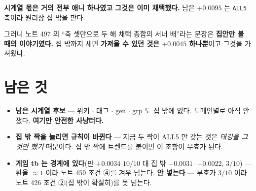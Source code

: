 \documentclass[11pt]{article}
\begin{document}
\textbf{시계열 몫은 거의 전부 애니 하나였고 그것은 이미 채택했다.} 남은
$+0.0095$ 는 \texttt{ALL5} 축이라 원리상 집 밖을 판다.

그러니 노트 497 의 ``축 셋만으로 두 해 채택 총합의 서너 배''라는 문장은
\textbf{집안만 볼 때의 이야기였다.} 집 밖까지 세면 \textbf{가져올 수
있던 것은 $+0.0045$ 하나뿐}이고 그것을 가져왔다.

\section*{남은 것}

\begin{itemize}
\item \textbf{남은 시계열 후보} --- 위키 $\cdot$ 태그 $\cdot$ gen $\cdot$
grp 도 집 밖에 없다. 도메인별로 아직 안 쟀다. \textbf{여기만 안전한
사냥터다.}
\item \textbf{집 밖 짝을 늘리면 규칙이 바뀐다} --- 지금 두 짝이 ALL5 만
갖는 것은 \emph{태깅을 그것만 했기} 때문이다. 집 밖 짝에 트렌드를 붙이면
이 조항이 무효가 된다.
\item \textbf{게임 tb 는 경계에 있다}(판 $+0.0034$ $10/10$ 대 집 밖
$-0.0031 \cdot -0.0022$, $3/10$) --- 환율 $\approx 1$ 이라 노트 459
조건 ④를 겨우 넘는다. \textbf{안 넣는다} --- 부호가 $3/10$ 이라 노트 426
조건 ②(집 밖이 확실히)를 못 넘는다.
\end{itemize}
\end{document}
